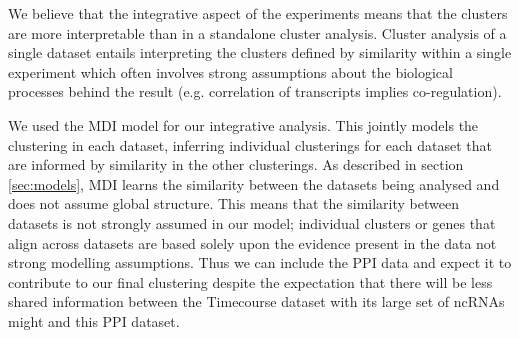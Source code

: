 \documentclass[]{article}
\begin{document}

We believe that the integrative aspect of the experiments means that the clusters are more interpretable than in a standalone cluster analysis. Cluster analysis of a single dataset entails interpreting the clusters defined by similarity within a single experiment which often involves strong assumptions about the biological processes behind the result (e.g. correlation of transcripts implies co-regulation).



We used the MDI model for our integrative analysis. This jointly models the clustering in each dataset, inferring individual clusterings for each dataset that are informed by similarity in the other clusterings. As described in section \ref{sec:models}, MDI learns the similarity between the datasets being analysed and does not assume global structure. This means that the similarity between datasets is not strongly assumed in our model; individual clusters or genes that align across datasets are based solely upon the evidence present in the data not strong modelling assumptions. Thus we can include the PPI data and expect it to contribute to our final clustering despite the expectation that there will be less shared information between the Timecourse dataset with its large set of ncRNAs might and this PPI dataset.

\end{document}

